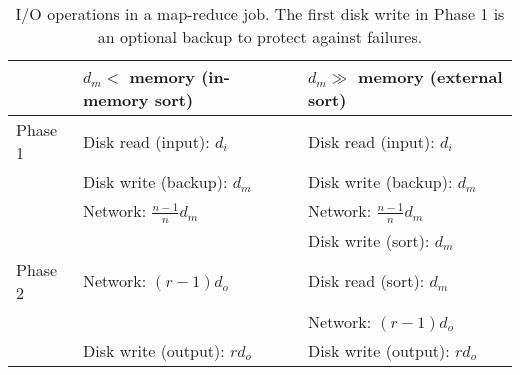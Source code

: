 {
\renewcommand{\baselinestretch}{1.0}
\begin{table}[t]
\centering
\begin{minipage}{1\textwidth}
\centering
\renewcommand{\arraystretch}{1.2}
\begin{tabular}{|l|l|l|}
\hline
        & $d_m < $ memory (in-memory sort) & $d_m \gg $ memory (external sort) \\ \hline
Phase 1
        & Disk read (input): $d_i$        & Disk read (input): $d_i$ \\
        & Disk write (backup): $d_m$      & Disk write (backup): $d_m$ \\
        & Network: $\frac{n-1}{n} d_m$    & Network: $\frac{n-1}{n} d_m$ \\
        &                                 & Disk write (sort): $d_m$ \\ \hline
Phase 2 & Network: $\left(r-1\right) d_o$ & Disk read (sort): $d_m$ \\
        &                                 & Network: $\left(r-1\right) d_o$ \\
        & Disk write (output): $r d_o$    & Disk write (output): $r d_o$ \\
\hline
\end{tabular}
\caption{I/O operations in a map-reduce job.
The first disk write in Phase 1 is an optional backup to protect
against failures.}
\label{table:operations2}
\end{minipage}
\end{table}
}
